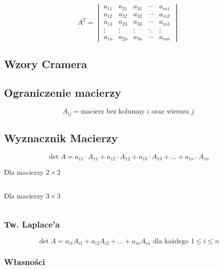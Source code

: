 \documentclass{../notatki}
\begin{document}
$$
A^T =
\begin{vmatrix}
    a_{11} & a_{21} & a_{31} & \cdots & a_{m1} \\
    a_{12} & a_{22} & a_{32} & \cdots & a_{m2} \\
    a_{13} & a_{23} & a_{33} & \cdots & a_{m3} \\
    \vdots & \vdots & \vdots & \ddots & \vdots \\
    a_{1n} & a_{2n} & a_{3n} & \cdots & a_{mn}
\end{vmatrix}
$$

\subsection{Wzory Cramera}

\subsection{Ograniczenie macierzy}

$$
A_{ij} = \text{macierz bez kolumny } i \text{ oraz wierszu } j
$$

\subsection{Wyznacznik Macierzy}

$$
\det A = a_{11} \cdot A_{11} + a_{12} \cdot A_{12} + a_{13} \cdot A_{13} + \dots + a_{1n} \cdot A_{1n}
$$

Dla macierzy $2 \times 2$

$$
$$

Dla macierzy $3 \times 3$

$$
$$

\subsubsection{Tw. Laplace'a}

$$
\det A = a_{i1}A_{i1} + a_{i2}A_{i2} + \dots + a_{in}A_{in} \text{ dla każdego } 1 \le i \le n
$$

\subsubsection{Własności}
\end{document}
